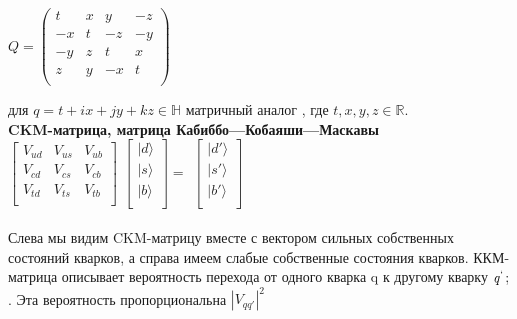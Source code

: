 \documentclass{article}
\begin{document}
\begin{flushright}$
Q=
\left(\begin{matrix}
t & x & y & -z \\
-x & t & -z & -y \\
-y & z & t & x \\
z & y & -x & t \\
\end{matrix}\right)
$\end{flushright}

для $q=t+ix+jy+kz \in \mathbb{H}$ матричный аналог ,
где $t,x,y,z \in \mathbb{R}$.
\\

{\bf CKM-матрица, матрица Кабиббо—Кобаяши—Маскавы}
\\
$ 
\begin{bmatrix}
V_{ud} & V_{us} & V_{ub} \\
V_{cd} & V_{cs} & V_{cb} \\
V_{td} & V_{ts} & V_{tb} \\
\end{bmatrix}
$
$
\begin{bmatrix}
|d\rangle \\
|s\rangle \\
|b\rangle \\
\end{bmatrix} = 
$
$
\begin{bmatrix}
|d'\rangle \\
|s'\rangle \\
|b'\rangle \\
\end{bmatrix} 
$
\\
\\
Слева мы видим CKM-матрицу вместе с вектором сильных собственных
состояний кварков, а справа имеем слабые собственные состояния кварков.
ККМ-матрица описывает вероятность перехода от одного кварка q к другому
кварку ${\it q}^`$; . Эта вероятность пропорциональна
 $|V_{qq'}|^2$
\end{document}
